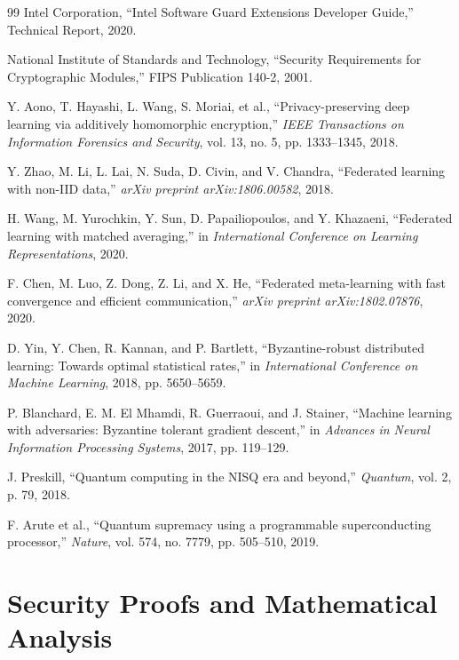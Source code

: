 \documentclass[12pt,a4paper,twoside]{book}
\begin{document}
\begin{thebibliography}{99}
Intel Corporation, ``Intel Software Guard Extensions Developer Guide,'' Technical Report, 2020.

National Institute of Standards and Technology, ``Security Requirements for Cryptographic Modules,'' FIPS Publication 140-2, 2001.

Y. Aono, T. Hayashi, L. Wang, S. Moriai, et al., ``Privacy-preserving deep learning via additively homomorphic encryption,'' \textit{IEEE Transactions on Information Forensics and Security}, vol. 13, no. 5, pp. 1333--1345, 2018.

Y. Zhao, M. Li, L. Lai, N. Suda, D. Civin, and V. Chandra, ``Federated learning with non-IID data,'' \textit{arXiv preprint arXiv:1806.00582}, 2018.

H. Wang, M. Yurochkin, Y. Sun, D. Papailiopoulos, and Y. Khazaeni, ``Federated learning with matched averaging,'' in \textit{International Conference on Learning Representations}, 2020.

F. Chen, M. Luo, Z. Dong, Z. Li, and X. He, ``Federated meta-learning with fast convergence and efficient communication,'' \textit{arXiv preprint arXiv:1802.07876}, 2020.

D. Yin, Y. Chen, R. Kannan, and P. Bartlett, ``Byzantine-robust distributed learning: Towards optimal statistical rates,'' in \textit{International Conference on Machine Learning}, 2018, pp. 5650--5659.

P. Blanchard, E. M. El Mhamdi, R. Guerraoui, and J. Stainer, ``Machine learning with adversaries: Byzantine tolerant gradient descent,'' in \textit{Advances in Neural Information Processing Systems}, 2017, pp. 119--129.

J. Preskill, ``Quantum computing in the NISQ era and beyond,'' \textit{Quantum}, vol. 2, p. 79, 2018.

F. Arute et al., ``Quantum supremacy using a programmable superconducting processor,'' \textit{Nature}, vol. 574, no. 7779, pp. 505--510, 2019.

\end{thebibliography}

\appendix

\chapter{Security Proofs and Mathematical Analysis}
\label{app:security-proofs}
\end{document}
